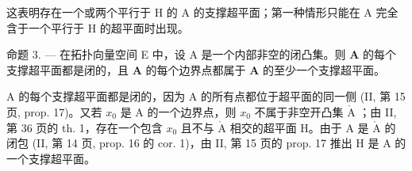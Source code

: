 这表明存在一个或两个平行于 H 的 A 的支撑超平面；第一种情形只能在 A 完全含于一个平行于 H 的超平面时出现。

命题 3. --- 在拓扑向量空间 E 中，设 A 是一个内部非空的闭凸集。则 \(\mathbf{A}\) 的每个支撑超平面都是闭的，且 \(\mathbf{A}\) 的每个边界点都属于 \(\mathbf{A}\) 的至少一个支撑超平面。

A 的每个支撑超平面都是闭的，因为 A 的所有点都位于超平面的同一侧 (II, 第 15 页, prop. 17)。又若 \(x_0\) 是 A 的一个边界点，则 \(x_0\) 不属于非空开凸集 \(\mathring{\mathrm{A}}\) ；由 II, 第 36 页的 th. 1，存在一个包含 \(x_0\) 且不与 \(\mathring{\mathrm{A}}\) 相交的超平面 H。由于 A 是 \(\mathring{\mathrm{A}}\) 的闭包 (II, 第 14 页, prop. 16 的 cor. 1)，由 II, 第 15 页的 prop. 17 推出 H 是 A 的一个支撑超平面。

